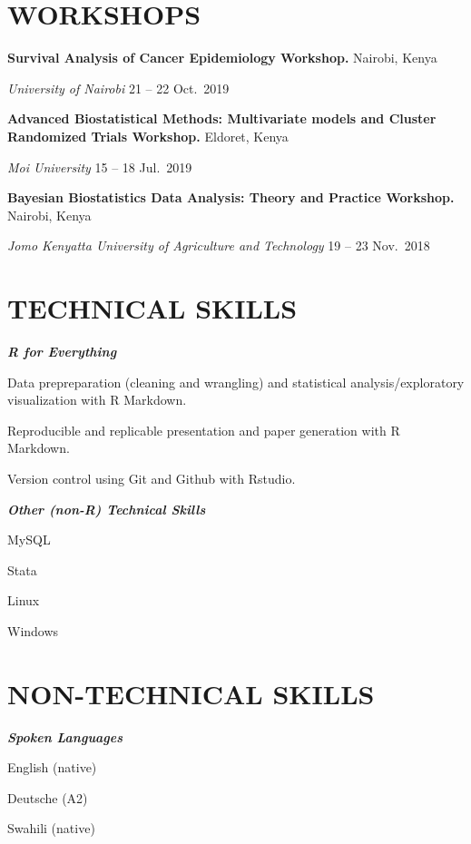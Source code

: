 \documentclass[12.5pt,]{article}
\providecommand{\tightlist}{%
  \setlength{\itemsep}{0pt}\setlength{\parskip}{0pt}}
\renewenvironment{itemize}{
  \begin{list}{}{
    \setlength{\leftmargin}{1.5em}
  }
}{
  \end{list}
}
\begin{document}
\hypertarget{workshops}{%
\section{\texorpdfstring{\textbf{WORKSHOPS}}{WORKSHOPS}}\label{workshops}}

\textbf{Survival Analysis of Cancer Epidemiology Workshop.}
\hfill Nairobi, Kenya

\emph{University of Nairobi} \hfill 21 -- 22 Oct.~2019

\textbf{Advanced Biostatistical Methods: Multivariate models and Cluster
Randomized Trials Workshop.} \hfill Eldoret, Kenya

\emph{Moi University} \hfill 15 -- 18 Jul.~2019

\textbf{Bayesian Biostatistics Data Analysis: Theory and Practice
Workshop.} \hfill Nairobi, Kenya

\emph{Jomo Kenyatta University of Agriculture and Technology} \hfill 19
-- 23 Nov.~2018

\hypertarget{technical-skills}{%
\section{\texorpdfstring{\textbf{TECHNICAL
SKILLS}}{TECHNICAL SKILLS}}\label{technical-skills}}

\emph{\textbf{R for Everything}}

\begin{itemize}
\tightlist
\item
  Data prepreparation (cleaning and wrangling) and statistical
  analysis/exploratory visualization with R Markdown.
\item
  Reproducible and replicable presentation and paper generation with R
  Markdown.
\item
  Version control using Git and Github with Rstudio.
\end{itemize}

\emph{\textbf{Other (non-R) Technical Skills}}

\begin{itemize}
\tightlist
\item
  MySQL
\item
  Stata
\item
  Linux
\item
  Windows
\end{itemize}

\hypertarget{non-technical-skills}{%
\section{\texorpdfstring{\textbf{NON-TECHNICAL
SKILLS}}{NON-TECHNICAL SKILLS}}\label{non-technical-skills}}

\emph{\textbf{Spoken Languages}}

\begin{itemize}
\tightlist
\item
  English (native)
\item
  Deutsche (A2)
\item
  Swahili (native)
\end{itemize}
\end{document}
